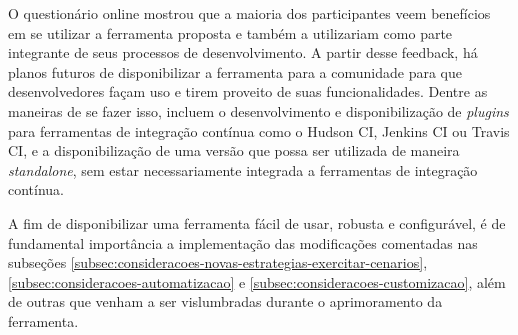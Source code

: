 O questionário online mostrou que a maioria dos participantes veem benefícios em se utilizar a ferramenta proposta e também a utilizariam como parte integrante de seus processos de desenvolvimento. A partir desse feedback, há planos futuros de disponibilizar a ferramenta para a comunidade para que desenvolvedores façam uso e tirem proveito de suas funcionalidades. Dentre as maneiras de se fazer isso, incluem o desenvolvimento e disponibilização de \textit{plugins} para ferramentas de integração contínua como o Hudson CI, Jenkins CI ou Travis CI, e a disponibilização de uma versão que possa ser utilizada de maneira \textit{standalone}, sem estar necessariamente integrada a ferramentas de integração contínua.

A fim de disponibilizar uma ferramenta fácil de usar, robusta e configurável, é de fundamental importância a implementação das modificações comentadas nas subseções \ref{subsec:consideracoes-novas-estrategias-exercitar-cenarios}, \ref{subsec:consideracoes-automatizacao} e \ref{subsec:consideracoes-customizacao}, além de outras que venham a ser vislumbradas durante o aprimoramento da ferramenta.